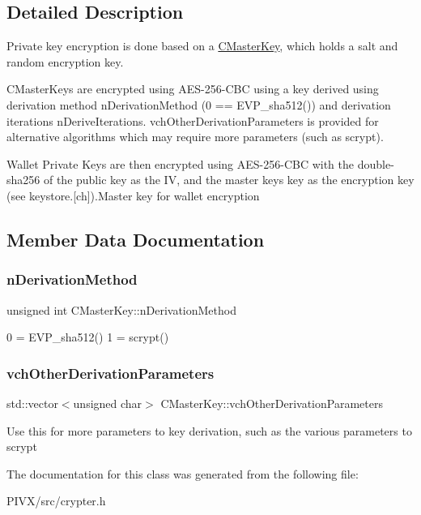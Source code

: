 \subsection{Detailed Description}
Private key encryption is done based on a \mbox{\hyperlink{class_c_master_key}{C\+Master\+Key}}, which holds a salt and random encryption key.

C\+Master\+Keys are encrypted using A\+E\+S-\/256-\/\+C\+BC using a key derived using derivation method n\+Derivation\+Method (0 == E\+V\+P\+\_\+sha512()) and derivation iterations n\+Derive\+Iterations. vch\+Other\+Derivation\+Parameters is provided for alternative algorithms which may require more parameters (such as scrypt).

Wallet Private Keys are then encrypted using A\+E\+S-\/256-\/\+C\+BC with the double-\/sha256 of the public key as the IV, and the master key\textquotesingle{}s key as the encryption key (see keystore.\mbox{[}ch\mbox{]}).Master key for wallet encryption 

\subsection{Member Data Documentation}
\mbox{\label{class_c_master_key_a7a4b1e432a30011297f496441769957f}} 
\subsubsection{\texorpdfstring{n\+Derivation\+Method}{nDerivationMethod}}
{\footnotesize\ttfamily unsigned int C\+Master\+Key\+::n\+Derivation\+Method}

0 = E\+V\+P\+\_\+sha512() 1 = scrypt() \mbox{\label{class_c_master_key_abfd00b311d5e5cf9ae1a6f3877ed35f7}} 
\subsubsection{\texorpdfstring{vch\+Other\+Derivation\+Parameters}{vchOtherDerivationParameters}}
{\footnotesize\ttfamily std\+::vector$<$unsigned char$>$ C\+Master\+Key\+::vch\+Other\+Derivation\+Parameters}

Use this for more parameters to key derivation, such as the various parameters to scrypt 

The documentation for this class was generated from the following file\+:\begin{DoxyCompactItemize}
\item 
P\+I\+V\+X/src/crypter.\+h\end{DoxyCompactItemize}
